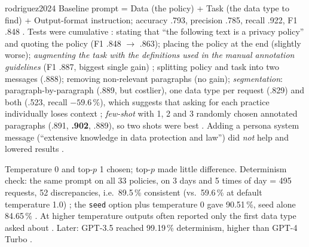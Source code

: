 \begin{papercard}{rodriguez2024}
 Baseline prompt = Data (the policy) + Task (the data type to find) + Output-format instruction; accuracy .793, precision .785, recall .922, F1 .848 . Tests were cumulative : stating that ``the following text is a privacy policy'' and quoting the policy (F1 .848 $\to$ .863); placing the policy at the end (slightly worse); \emph{augmenting the task with the definitions used in the manual annotation guidelines} (F1 .887, biggest single gain) ; splitting policy and task into two messages (.888); removing non-relevant paragraphs (no gain); \emph{segmentation}: paragraph-by-paragraph (.889, but costlier), one data type per request (.829) and both (.523, recall $-59.6\,\%$), which suggests that asking for each practice individually loses context ; \emph{few-shot} with 1, 2 and 3 randomly chosen annotated paragraphs (.891, \textbf{.902}, .889), so two shots were best . Adding a persona system message (``extensive knowledge in data protection and law'') did \emph{not} help and lowered results .

 Temperature 0 and top-$p$ 1 chosen; top-$p$ made little difference. Determinism check: the same prompt on all 33 policies, on 3 days and 5 times of day = 495 requests, 52 discrepancies, i.e.\ 89.5\,\% consistent (vs.\ 59.6\,\% at default temperature 1.0) ; the \texttt{seed} option plus temperature 0 gave 90.51\,\%, seed alone 84.65\,\% . At higher temperature outputs often reported only the first data type asked about . Later: GPT-3.5 reached 99.19\,\% determinism, higher than GPT-4 Turbo .


\end{papercard}
